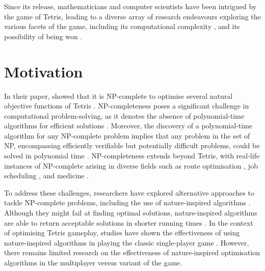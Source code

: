 \documentclass[a4paper, 12pt]{extreport}
\begin{document}
		Since its release, mathematicians and computer scientists have been intrigued by the game of Tetris, leading to a diverse array of research endeavours exploring the various facets of the game, including its computational complexity \cite{tetris-is-hard-even-to-approx}, and its possibility of being won \cite{can-you-win-at-tetris} \cite{how-to-lose-at-tetris}.
		
		\section{Motivation}
		
	 		
	 		In their paper, \citeauthor{tetris-is-hard-even-to-approx} showed that it is NP-complete to optimise several natural objective functions of Tetris \cite{tetris-is-hard-even-to-approx}. NP-completeness poses a significant challenge in computational problem-solving, as it denotes the absence of polynomial-time algorithms for efficient solutions \cite{sipser-intro-to-computation}. Moreover, the discovery of a polynomial-time algorithm for any NP-complete problem implies that any problem in the set of NP, encompassing efficiently verifiable but potentially difficult problems, could be solved in polynomial time \cite{sipser-intro-to-computation}. NP-completeness extends beyond Tetris, with real-life instances of NP-complete arising in diverse fields such as route optimisation \cite{route-optimisation-np-complete}, job scheduling \cite{job-scheduling-np-complete}, and medicine \cite{medical-diagnosis-np-complete}.
	 		
	 		To address these challenges, researchers have explored alternative approaches to tackle NP-complete problems, including the use of nature-inspired algorithms \cite{job-shop-ga}. Although they might fail at finding optimal solutions, nature-inspired algorithms are able to return acceptable solutions in shorter running times \cite{review-nia-wael}. In the context of optimising Tetris gameplay, studies have shown the effectiveness of using nature-inspired algorithms in playing the classic single-player game \cite{tetris-ga-lewis} \cite{swarm-tetris}. However, there remains limited research on the effectiveness of nature-inspired optimisation algorithms in the multiplayer versus variant of the game.
			
\end{document}
